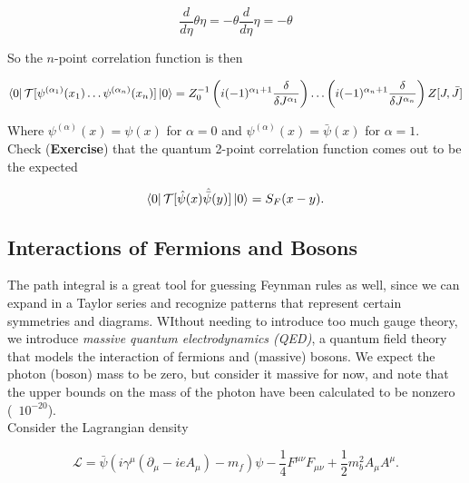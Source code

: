 \begin{equation}
\frac{d}{d\eta} \theta \eta = - \theta \frac{d}{d \eta} \eta = - \theta
\end{equation}

\noindent So the $n$-point correlation function is then

\begin{equation}
\bra{0} \mathcal{T} [ \psi^{(\alpha_1)} (x_1) \dots \psi^{(\alpha_n)} (x_n) ] \ket{0} = Z_0^{-1} \left( i (-1)^{\alpha_1 + 1} \frac{\delta}{\delta J^{\alpha_1}} \right) \dots \left( i (-1)^{\alpha_n + 1} \frac{\delta}{\delta J^{\alpha_n}} \right) Z[J,\bar{J}]
\end{equation}

\noindent Where $\psi^{(\alpha)} (x) = \psi (x)$ for $\alpha=0$ and $\psi^{(\alpha)} (x) = \bar{\psi} (x)$ for $\alpha=1$. \\

\noindent Check (\textbf{Exercise}) that the quantum 2-point correlation function comes out to be the expected

\begin{equation}
\bra{0} \mathcal{T} [ \hat{\psi} (x) \hat{\bar{\psi}} (y) ] \ket{0} = S_F (x-y).
\end{equation}

\subsection*{Interactions of Fermions and Bosons}

\noindent The path integral is a great tool for guessing Feynman rules as well, since we can expand in a Taylor series and recognize patterns that represent certain symmetries and diagrams. WIthout needing to introduce too much gauge theory, we introduce \textit{massive quantum electrodynamics (QED)}, a quantum field theory that models the interaction of fermions and (massive) bosons. We expect the photon (boson) mass to be zero, but consider it massive for now, and note that the upper bounds on the mass of the photon have been calculated to be nonzero (~$10^{-20}$). \\

\noindent Consider the Lagrangian density

\begin{equation}
\mathcal{L} = \bar{\psi} ( i \gamma^\mu (\partial_\mu - i e A_\mu) - m_f ) \psi - \frac{1}{4} F^{\mu\nu}F_{\mu\nu} + \frac{1}{2} m_b^2 A_\mu A^\mu.
\end{equation}

